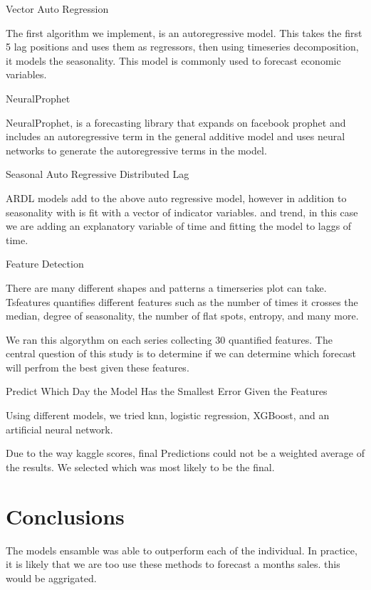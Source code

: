 \documentclass[12pt,twocolumn,letterpaper]{article}
\begin{document}
Vector Auto Regression

The first algorithm we implement, is an autoregressive model. This takes the first 5 lag positions and uses them as regressors, then using timeseries decomposition, it models the seasonality. This model is commonly used to forecast economic variables. 

NeuralProphet

NeuralProphet, is a forecasting library that expands on facebook prophet and includes an autoregressive term in the general additive model and uses neural networks to generate the autoregressive terms in the model.

Seasonal Auto Regressive Distributed Lag

ARDL models add to the above auto regressive model, however in addition to seasonality with is fit with a vector of indicator variables. and trend, in this case we are adding an explanatory variable of time and fitting the model to laggs of time.

Feature Detection

There are many different shapes and patterns a timerseries plot can take. Tsfeatures \cite{montero2020fforma} quantifies different features such as the number of times it crosses the median, degree of seasonality, the number of flat spots, entropy, and many more. 

We ran this algorythm on each series collecting 30 quantified features. The central question of this study is to determine if we can determine which forecast will perfrom the best given these features. 

Predict Which Day the Model Has the Smallest Error Given the Features

Using different models, we tried knn, logistic regression, XGBoost, and an artificial neural network. 

Due to the way kaggle scores, final Predictions could not be a weighted average of the results. We selected which was most likely to be the final.

\section{Conclusions}

The models ensamble was able to outperform each of the individual. In practice, it is likely that we are too use these methods to forecast a months sales. this would be aggrigated.

\clearpage
\onecolumn


\end{document}
